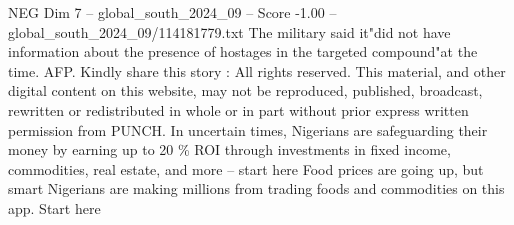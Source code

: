 \begin{textsample}{NEG Dim 7 – global\_south\_2024\_09 – Score -1.00 – global\_south\_2024\_09/114181779.txt}
The military said it"did not have information about the presence of hostages in the targeted compound"at the time.
AFP.
Kindly share this story : All rights reserved.
This material, and other digital content on this website, may not be reproduced, published, broadcast, rewritten or redistributed in whole or in part without prior express written permission from PUNCH.
In uncertain times, Nigerians are safeguarding their money by earning up to 20 \% ROI through investments in fixed income, commodities, real estate, and more -- start here Food prices are going up, but smart Nigerians are making millions from trading foods and commodities on this app.
Start here

\end{textsample}
